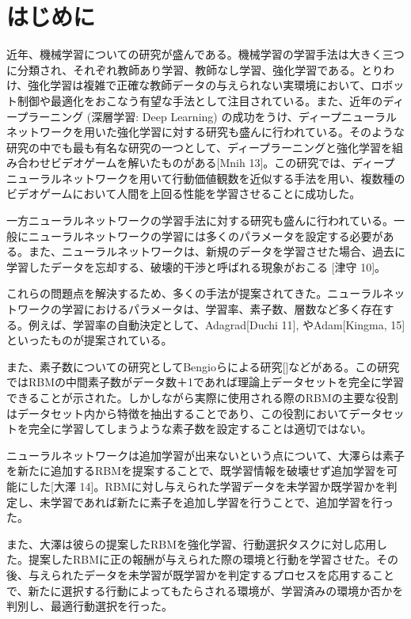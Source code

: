 \chapter{はじめに}

近年、機械学習についての研究が盛んである。機械学習の学習手法は大きく三つに分類され、それぞれ教師あり学習、教師なし学習、強化学習である。とりわけ、強化学習は複雑で正確な教師データの与えられない実環境において、ロボット制御や最適化をおこなう有望な手法として注目されている。また、近年のディープラーニング (深層学習: Deep Learning) の成功をうけ、ディープニューラルネットワークを用いた強化学習に対する研究も盛んに行われている。そのような研究の中でも最も有名な研究の一つとして、ディープラーニングと強化学習を組み合わせビデオゲームを解いたものがある[Mnih 13]。この研究では、ディープニューラルネットワークを用いて行動価値観数を近似する手法を用い、複数種のビデオゲームにおいて人間を上回る性能を学習させることに成功した。

一方ニューラルネットワークの学習手法に対する研究も盛んに行われている。一般にニューラルネットワークの学習には多くのパラメータを設定する必要がある。また、ニューラルネットワークは、新規のデータを学習させた場合、過去に学習したデータを忘却する、破壊的干渉と呼ばれる現象がおこる [津守 10]。

これらの問題点を解決するため、多くの手法が提案されてきた。ニューラルネットワークの学習におけるパラメータは、学習率、素子数、層数など多く存在する。例えば、学習率の自動決定として、Adagrad[Duchi 11], やAdam[Kingma, 15]といったものが提案されている。

また、素子数についての研究としてBengioらによる研究[]などがある。この研究ではRBMの中間素子数がデータ数＋1であれば理論上データセットを完全に学習できることが示された。しかしながら実際に使用される際のRBMの主要な役割はデータセット内から特徴を抽出することであり、この役割においてデータセットを完全に学習してしまうような素子数を設定することは適切ではない。

ニューラルネットワークは追加学習が出来ないという点について、大澤らは素子を新たに追加するRBMを提案することで、既学習情報を破壊せず追加学習を可能にした[大澤 14]。RBMに対し与えられた学習データを未学習か既学習かを判定し、未学習であれば新たに素子を追加し学習を行うことで、追加学習を行った。

また、大澤は彼らの提案したRBMを強化学習、行動選択タスクに対し応用した。提案したRBMに正の報酬が与えられた際の環境と行動を学習させた。その後、与えられたデータを未学習が既学習かを判定するプロセスを応用することで、新たに選択する行動によってもたらされる環境が、学習済みの環境か否かを判別し、最適行動選択を行った。

